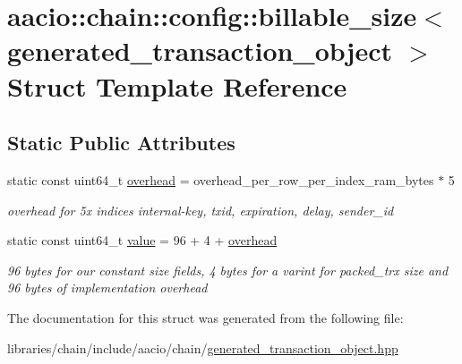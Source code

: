 \hypertarget{structaacio_1_1chain_1_1config_1_1billable__size_3_01generated__transaction__object_01_4}{}\section{aacio\+:\+:chain\+:\+:config\+:\+:billable\+\_\+size$<$ generated\+\_\+transaction\+\_\+object $>$ Struct Template Reference}
\label{structaacio_1_1chain_1_1config_1_1billable__size_3_01generated__transaction__object_01_4}
\subsection*{Static Public Attributes}
\begin{DoxyCompactItemize}
\item 
\mbox{\label{structaacio_1_1chain_1_1config_1_1billable__size_3_01generated__transaction__object_01_4_ab01d091ad5a64fab06def3f18bb25ac3}} 
static const uint64\+\_\+t \mbox{\hyperlink{structaacio_1_1chain_1_1config_1_1billable__size_3_01generated__transaction__object_01_4_ab01d091ad5a64fab06def3f18bb25ac3}{overhead}} = overhead\+\_\+per\+\_\+row\+\_\+per\+\_\+index\+\_\+ram\+\_\+bytes $\ast$ 5
\begin{DoxyCompactList}\small\item\em overhead for 5x indices internal-\/key, txid, expiration, delay, sender\+\_\+id \end{DoxyCompactList}\item 
\mbox{\label{structaacio_1_1chain_1_1config_1_1billable__size_3_01generated__transaction__object_01_4_aead8f025cf249088efc263a5aac96a45}} 
static const uint64\+\_\+t \mbox{\hyperlink{structaacio_1_1chain_1_1config_1_1billable__size_3_01generated__transaction__object_01_4_aead8f025cf249088efc263a5aac96a45}{value}} = 96 + 4 + \mbox{\hyperlink{structaacio_1_1chain_1_1config_1_1billable__size_3_01generated__transaction__object_01_4_ab01d091ad5a64fab06def3f18bb25ac3}{overhead}}
\begin{DoxyCompactList}\small\item\em 96 bytes for our constant size fields, 4 bytes for a varint for packed\+\_\+trx size and 96 bytes of implementation overhead \end{DoxyCompactList}\end{DoxyCompactItemize}


The documentation for this struct was generated from the following file\+:\begin{DoxyCompactItemize}
\item 
libraries/chain/include/aacio/chain/\mbox{\hyperlink{generated__transaction__object_8hpp}{generated\+\_\+transaction\+\_\+object.\+hpp}}\end{DoxyCompactItemize}
